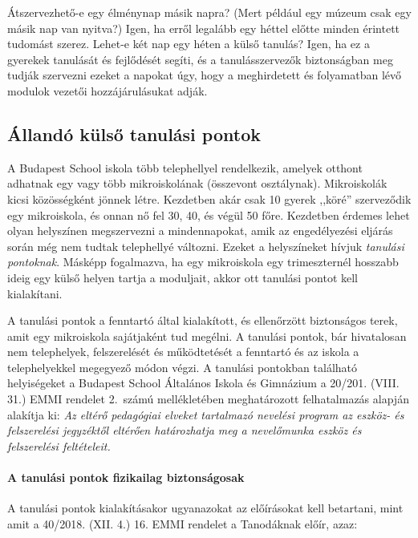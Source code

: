 Átszervezhető-e egy élménynap másik napra? (Mert például egy múzeum csak egy másik nap van nyitva?) Igen, ha erről legalább egy héttel előtte minden érintett tudomást szerez. Lehet-e két nap egy héten a külső tanulás? Igen, ha ez a gyerekek tanulását és fejlődését segíti, és a tanulásszervezők biztonságban meg tudják szervezni ezeket a napokat úgy, hogy a meghirdetett és folyamatban lévő modulok vezetői hozzájárulásukat adják.

\subsection{Állandó külső tanulási pontok}

A Budapest School iskola több telephellyel rendelkezik, amelyek otthont adhatnak egy vagy több mikroiskolának (összevont osztálynak). Mikroiskolák kicsi közösségként jönnek létre. Kezdetben akár csak 10 gyerek ,,köré'' szerveződik egy mikroiskola, és onnan nő fel 30, 40, és végül 50 főre. Kezdetben érdemes lehet olyan helyszínen megszervezni a mindennapokat, amik az engedélyezési eljárás során még nem tudtak telephellyé változni. Ezeket a helyszíneket hívjuk \emph{tanulási pontoknak}.  Másképp fogalmazva, ha egy mikroiskola egy trimeszternél hosszabb ideig egy külső helyen tartja a moduljait, akkor ott tanulási pontot kell kialakítani.

A tanulási pontok a fenntartó által kialakított, és ellenőrzött biztonságos terek, amit egy mikroiskola sajátjaként tud megélni. A tanulási pontok, bár hivatalosan nem telephelyek, felszerelését és működtetését a fenntartó és az iskola a telephelyekkel megegyező módon végzi. A tanulási pontokban található helyiségeket a Budapest School Általános Iskola és Gimnázium a 20/201. (VIII. 31.) EMMI rendelet 2.~számú mellékletében meghatározott felhatalmazás alapján alakítja ki: \emph{Az eltérő pedagógiai elveket tartalmazó nevelési program az eszköz- és felszerelési jegyzéktől eltérően határozhatja meg a nevelőmunka eszköz és felszerelési feltételeit.}

\paragraph{A tanulási pontok fizikailag biztonságosak}
A tanulási pontok kialakításakor ugyanazokat az előírásokat kell betartani, mint amit a 40/2018. (XII. 4.) 16. EMMI rendelet a Tanodáknak előír, azaz:


